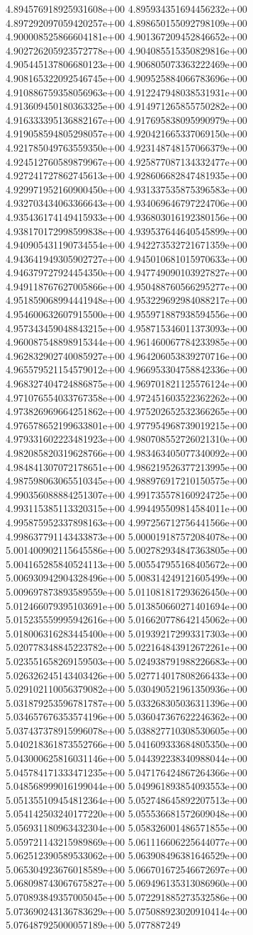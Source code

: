 4.894576918925931608e+00	4.895934351694456232e+00	4.897292097059420257e+00	4.898650155092798109e+00	4.900008525866604181e+00	4.901367209452846652e+00	4.902726205923572778e+00	4.904085515350829816e+00	4.905445137806680123e+00	4.906805073363222469e+00	4.908165322092546745e+00	4.909525884066783696e+00	4.910886759358056963e+00	4.912247948038531931e+00	4.913609450180363325e+00	4.914971265855750282e+00	4.916333395136882167e+00	4.917695838095990979e+00	4.919058594805298057e+00	4.920421665337069150e+00	4.921785049763559350e+00	4.923148748157066379e+00	4.924512760589879967e+00	4.925877087134332477e+00	4.927241727862745613e+00	4.928606682847481935e+00	4.929971952160900450e+00	4.931337535875396583e+00	4.932703434063366643e+00	4.934069646797224706e+00	4.935436174149415933e+00	4.936803016192380156e+00	4.938170172998599838e+00	4.939537644640545899e+00	4.940905431190734554e+00	4.942273532721671359e+00	4.943641949305902727e+00	4.945010681015970633e+00	4.946379727924454350e+00	4.947749090103927827e+00	4.949118767627005866e+00	4.950488760566295277e+00	4.951859068994441948e+00	4.953229692984088217e+00	4.954600632607915500e+00	4.955971887938594556e+00	4.957343459048843215e+00	4.958715346011373093e+00	4.960087548898915344e+00	4.961460067784233985e+00	4.962832902740085927e+00	4.964206053839270716e+00	4.965579521154579012e+00	4.966953304758842336e+00	4.968327404724886875e+00	4.969701821125576124e+00	4.971076554033767358e+00	4.972451603522362262e+00	4.973826969664251862e+00	4.975202652532366265e+00	4.976578652199633801e+00	4.977954968739019215e+00	4.979331602223481923e+00	4.980708552726021310e+00	4.982085820319628766e+00	4.983463405077340092e+00	4.984841307072178651e+00	4.986219526377213995e+00	4.987598063065510345e+00	4.988976917210150575e+00	4.990356088884251307e+00	4.991735578160924725e+00	4.993115385113320315e+00	4.994495509814584011e+00	4.995875952337898163e+00	4.997256712756441566e+00	4.998637791143433873e+00	5.000019187572084078e+00	5.001400902115645586e+00	5.002782934847363805e+00	5.004165285840524113e+00	5.005547955168405672e+00	5.006930942904328496e+00	5.008314249121605499e+00	5.009697873893589559e+00	5.011081817293626450e+00	5.012466079395103691e+00	5.013850660271401694e+00	5.015235559995942616e+00	5.016620778642145062e+00	5.018006316283445400e+00	5.019392172993317303e+00	5.020778348845223782e+00	5.022164843912672261e+00	5.023551658269159503e+00	5.024938791988226683e+00	5.026326245143403426e+00	5.027714017808266433e+00	5.029102110056379082e+00	5.030490521961350936e+00	5.031879253596781787e+00	5.033268305036311396e+00	5.034657676353574196e+00	5.036047367622246362e+00	5.037437378915996078e+00	5.038827710308530605e+00	5.040218361873552766e+00	5.041609333684805350e+00	5.043000625816031146e+00	5.044392238340988044e+00	5.045784171333471235e+00	5.047176424867264366e+00	5.048568999016199044e+00	5.049961893854093553e+00	5.051355109454812364e+00	5.052748645892207513e+00	5.054142503240177220e+00	5.055536681572609048e+00	5.056931180963432304e+00	5.058326001486571855e+00	5.059721143215989869e+00	5.061116606225644077e+00	5.062512390589533062e+00	5.063908496381646529e+00	5.065304923676018589e+00	5.066701672546672697e+00	5.068098743067675827e+00	5.069496135313086960e+00	5.070893849357005045e+00	5.072291885273532586e+00	5.073690243136783629e+00	5.075088923020910414e+00	5.076487925000057189e+00	5.077887249